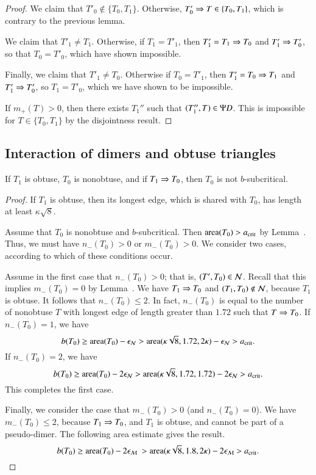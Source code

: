 \begin{proof}
  We claim that $T'_0\not\in \{T_0,T_1\}$.  Otherwise, $T'_0\Rightarrow
  T\in\{T_0,T_1\}$, which is contrary to the previous lemma.

  We claim that $T'_1\ne T_1$.  Otherwise, if $T_1=T'_1$, then
  $T'_1=T_1\Rightarrow T_0$ and $T'_1\Rightarrow T'_0$, so that $T_0 = T'_0$, which
  have shown impossible.

Finally, we claim that $T'_1\ne T_0$.  Otherwise if $T_0 = T'_1$, then
$T'_1 = T_0\Rightarrow T_1$ and $T'_1\Rightarrow T'_0$, so $T_1 = T'_0$, which we have
shown to be impossible.

If $m_+(T) >0$, then there exists $T_1''$ such that $(T_1'',T)\in
\Psi D$.  This is impossible for $T\in\{T_0,T_1\}$ by the disjointness
result.
\end{proof}


\subsection{Interaction of dimers and obtuse triangles}

\begin{lemma}
  If $T_1$ is obtuse, $T_0$ is nonobtuse, and if $T_1 \Rightarrow T_0$, then
  $T_0$ is not $b$-subcritical.
\end{lemma}


\begin{proof} 
  If $T_1$ is obtuse, then its longest edge, which is shared with
  $T_0$, has length at least $\kappa\sqrt8$.

  Assume that $T_0$ is nonobtuse and $b$-subcritical.  Then
  ${\operatorname{area}}(T_0) > a_\text{crit}$ by Lemma~.  Thus, we must
  have $n_-(T_0)>0$ or $m_-(T_0)>0$.  We consider two cases, according
  to which of these conditions occur.

  Assume in the first case that $n_-(T_0)>0$; that is, $(T',T_0)\in
  \mathcal N$.  Recall that this implies $m_-(T_0)=0$ by
  Lemma~.  We have $T_1\Rightarrow T_0$ and $(T_1,T_0)\not\in
  \mathcal N$, because $T_1$ is obtuse.  It follows that $n_-(T_0)\le 2$.  In
  fact, $n_-(T_0)$ is equal to the number of nonobtuse $T$ with
  longest edge of length greater than $1.72$ such that $T\Rightarrow T_0$.  If
  $n_-(T_0)=1$, we have
  \[
b(T_0) \ge {\operatorname{area}}(T_0) - \epsilon_{\mathcal N} 
> {\operatorname{area}}(\kappa\sqrt8,1.72,2\kappa)  - \epsilon_{\mathcal N} > a_\text{crit}.
\]
If $n_-(T_0)=2$, we have
  \[
b(T_0) \ge {\operatorname{area}}(T_0) - 2\epsilon_{\mathcal N} 
> {\operatorname{area}}(\kappa\sqrt8,1.72,1.72)  - 2\epsilon_{\mathcal N} > a_\text{crit}.
\]
  This completes the first case.

  Finally, we consider the case that $m_-(T_0)>0$ (and $n_-(T_0)=0$).
  We have $m_-(T_0)\le 2$, because $T_1\Rightarrow T_0$, and $T_1$ is obtuse,
  and cannot be part of a pseudo-dimer.  The following area estimate
  gives the result.
\[
  b(T_0) \ge \area(T_0) - 2\epsM\ 
  > \area(\kappa\sqrt8,1.8,2\kappa) -
  2\epsM > \acrit.
\]
\end{proof}


